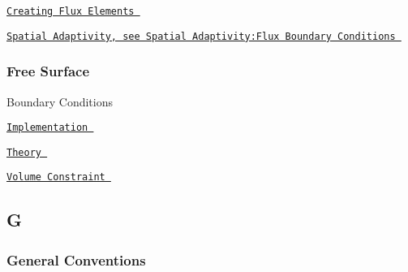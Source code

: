  
\begin{DoxyItemize}
\item  \href{ ../../poisson/two_d_poisson_flux_bc/html/index.html#create_flux }{\tt Creating Flux Elements }  
\item  \href{ ../../index/html/index.html#S.SpatialAdaptivity.FluxBoundaryConditions }{\tt Spatial Adaptivity, see Spatial Adaptivity\-:Flux Boundary Conditions }  
\end{DoxyItemize} \subsubsection*{ Free Surface }

 
\begin{DoxyItemize}
\item  Boundary Conditions   
\begin{DoxyItemize}
\item  \href{ ../../navier_stokes/single_layer_free_surface/html/index.html#implementation }{\tt Implementation }  
\item  \href{ ../../navier_stokes/single_layer_free_surface/html/index.html }{\tt Theory }  
\end{DoxyItemize} 
\item  \href{ ../../navier_stokes/static_single_layer/html/index.html#vol_const }{\tt Volume Constraint }  
\end{DoxyItemize}  \subsection*{ G }

 \subsubsection*{ General Conventions }

